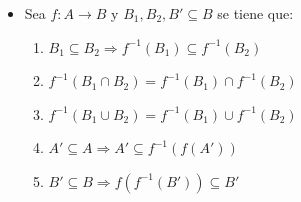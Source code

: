 \documentclass[letterpaper,11pt]{article}
\theoremstyle{plain}
\begin{document}
\begin{framed}
\begin{multicols}{2}
\begin{itemize}
                \item Sea $f: A \to B$ y $B_{1},B_{2},B' \subseteq B$ se tiene que:
                    \begin{enumerate}
                        \item $B_{1} \subseteq B_{2} \Rightarrow f^{-1}(B_{1})\subseteq f^{-1}(B_{2})$
                        \item $f^{-1}(B_{1} \cap B_{2}) = f^{-1}(B_{1}) \cap f^{-1}(B_{2})$
                        \item $f^{-1}(B_{1} \cup B_{2}) = f^{-1}(B_{1}) \cup f^{-1}(B_{2})$
                        \item $A'\subseteq A \Longrightarrow A'\subseteq f^{-1}(f(A'))$
                        \item $B'\subseteq B \Longrightarrow f(f^{-1}(B')) \subseteq B'$
                    \end{enumerate}
            \end{itemize}
        \end{multicols}
\end{framed}
\end{document}
